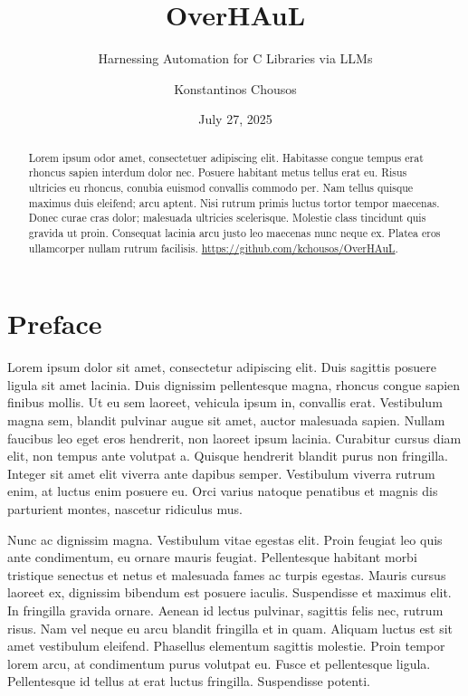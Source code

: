 \documentclass[
  a4paper,
  DIV=11,
  numbers=noendperiod]{scrreprt}
\title{OverHAuL}
\subtitle{Harnessing Automation for C Libraries via LLMs}
\author{Konstantinos Chousos}
\date{July 27, 2025}
\theoremstyle{definition}
\theoremstyle{remark}
\begin{document}
\maketitle
\begin{abstract}
Lorem ipsum odor amet, consectetuer adipiscing elit. Habitasse congue
tempus erat rhoncus sapien interdum dolor nec. Posuere habitant metus
tellus erat eu. Risus ultricies eu rhoncus, conubia euismod convallis
commodo per. Nam tellus quisque maximus duis eleifend; arcu aptent. Nisi
rutrum primis luctus tortor tempor maecenas. Donec curae cras dolor;
malesuada ultricies scelerisque. Molestie class tincidunt quis gravida
ut proin. Consequat lacinia arcu justo leo maecenas nunc neque ex.
Platea eros ullamcorper nullam rutrum facilisis.
\url{https://github.com/kchousos/OverHAuL}.
\end{abstract}





\chapter*{Preface}\label{preface}


Lorem ipsum dolor sit amet, consectetur adipiscing elit. Duis sagittis
posuere ligula sit amet lacinia. Duis dignissim pellentesque magna,
rhoncus congue sapien finibus mollis. Ut eu sem laoreet, vehicula ipsum
in, convallis erat. Vestibulum magna sem, blandit pulvinar augue sit
amet, auctor malesuada sapien. Nullam faucibus leo eget eros hendrerit,
non laoreet ipsum lacinia. Curabitur cursus diam elit, non tempus ante
volutpat a. Quisque hendrerit blandit purus non fringilla. Integer sit
amet elit viverra ante dapibus semper. Vestibulum viverra rutrum enim,
at luctus enim posuere eu. Orci varius natoque penatibus et magnis dis
parturient montes, nascetur ridiculus mus.

Nunc ac dignissim magna. Vestibulum vitae egestas elit. Proin feugiat
leo quis ante condimentum, eu ornare mauris feugiat. Pellentesque
habitant morbi tristique senectus et netus et malesuada fames ac turpis
egestas. Mauris cursus laoreet ex, dignissim bibendum est posuere
iaculis. Suspendisse et maximus elit. In fringilla gravida ornare.
Aenean id lectus pulvinar, sagittis felis nec, rutrum risus. Nam vel
neque eu arcu blandit fringilla et in quam. Aliquam luctus est sit amet
vestibulum eleifend. Phasellus elementum sagittis molestie. Proin tempor
lorem arcu, at condimentum purus volutpat eu. Fusce et pellentesque
ligula. Pellentesque id tellus at erat luctus fringilla. Suspendisse
potenti.
\end{document}
